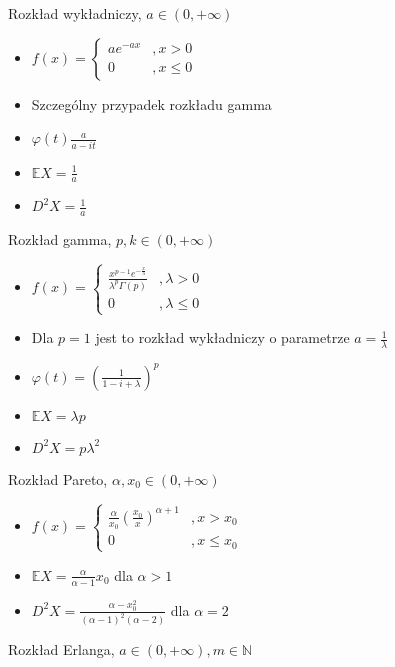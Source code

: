 \documentclass[a4paper,12pt]{report}
\theoremstyle{break}
\theoremstyle{definition}
\theoremstyle{defi}
\theoremstyle{break}
\theoremstyle{defi}
\begin{document}
{\Large Rozkład wykładniczy, $ a\in\left(0,+\infty \right) $}
\begin{multicols}{2}
\begin{itemize}
\item $ f(x)=
\left \{
\begin{array}{ll}
ae^{-ax}&,x>0\\
0&,x\le0
\end{array}
\right . $
\item Szczególny przypadek rozkładu gamma
\item $ \varphi(t)\frac{a}{a-it} $
\item $ \mathbb{E}X=\frac{1}{a} $
\item $ D^2X=\frac{1}{a} $
\end{itemize}
\end{multicols}
{\Large Rozkład gamma, $ p,k\in\left(0,+\infty \right) $}
\begin{multicols}{2}
\begin{itemize}
\item $ f(x)=
\left \{
\begin{array}{ll}
\frac{x^{p-1}e^{-\frac{x}{\lambda}}}{\lambda^p\Gamma(p)}&,\lambda>0\\
0&,\lambda\le0
\end{array}
\right . $
\item Dla $ p=1 $ jest to rozkład wykładniczy o parametrze $ a=\frac{1}{\lambda} $
\item $ \varphi(t)=\left(\frac{1}{1-i+\lambda}\right)^p $
\item $ \mathbb{E}X=\lambda p $
\item $ D^2X=p\lambda^2 $
\end{itemize}
\end{multicols}
{\Large Rozkład Pareto, $ \alpha,x_0\in (0,+\infty ) $}
\begin{multicols}{2}
\begin{itemize}
\item $ f(x)=
\left \{
\begin{array}{ll}
\frac{\alpha}{x_0}\left(\frac{x_0}{x}\right)^{\alpha+1}&,x>x_0\\
0&,x\le x_0
\end{array}
\right . $
\item $ \mathbb{E}X=\frac{\alpha}{\alpha-1}x_0 $ dla $ \alpha>1 $
\item $ D^2X=\frac{\alpha-x_0^2}{(\alpha-1)^2(\alpha-2)} $ dla $ \alpha=2 $
\end{itemize}
\end{multicols}
{\Large Rozkład Erlanga, $ a\in (0,+\infty ),m\in \mathbb{N} $}
\end{document}
